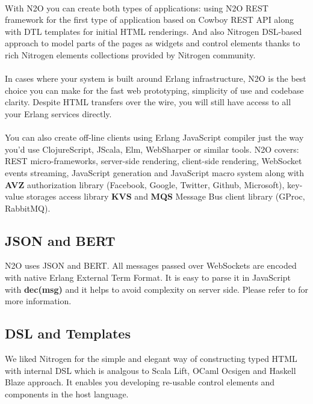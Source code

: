 \paragraph{}
With N2O you can create both types of applications: using N2O REST framework
for the first type of application based on Cowboy REST API along with DTL
templates for initial HTML renderings. And also Nitrogen DSL-based approach
to model parts of the pages as widgets and control elements thanks to rich
Nitrogen elements collections provided by Nitrogen community.

\paragraph{}
In cases where your system is built around Erlang infrastructure, N2O
is the best choice you can make for the fast web prototyping, simplicity
of use and codebase clarity. Despite HTML transfers over the wire,
you will still have access to all your Erlang services directly.

\paragraph{}
You can also create off-line clients using Erlang JavaScript compiler
just the way you'd use ClojureScript, JScala, Elm, WebSharper or similar
tools. N2O covers: REST micro-frameworks, server-side rendering,
client-side rendering, WebSocket events streaming, JavaScript generation
and JavaScript macro system along with {\bf AVZ} authorization
library (Facebook, Google, Twitter, Github, Microsoft), key-value storages
access library {\bf KVS} and {\bf MQS} Message Bus client library (GProc, RabbitMQ).

\subsection{JSON and BERT}
N2O uses JSON and BERT. All messages passed over
WebSockets are encoded with native Erlang External Term Format.
It is easy to parse it in JavaScript with {\bf dec(msg)}
and it helps to avoid complexity on server side. Please refer
to  for more information.

\subsection{DSL and Templates}
We liked Nitrogen for the simple and elegant way of constructing typed
HTML with internal DSL which is analgous to Scala Lift,
OCaml Ocsigen and Haskell Blaze approach. It enables you developing re-usable control
elements and components in the host language.

